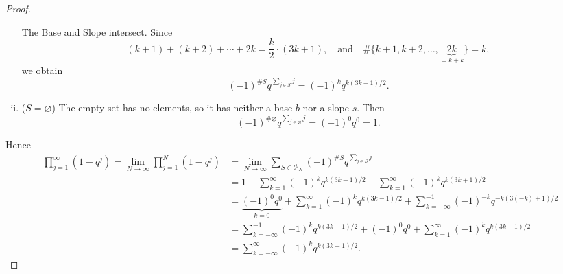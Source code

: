 \documentclass{article}
\theoremstyle{definition}
\newtheorem*{notation}{Notation}
\newcommand{\Z}{\mathbb{Z}}
\begin{document}
\begin{proof}
\begin{enumerate}[(i)]
\begin{center}
	\end{center}
	The Base and Slope intersect. Since \[
	(k+1)+(k+2)+\cdots+2k
	=
	\frac{k}{2}\cdot(3k+1),\quad\text{and}\quad
	\#\{k+1,k+2,\dots,\underbrace{2k}_{=k+k}\}=k,
	\] we obtain \[
	\boxed{(-1)^{\#S}q^{\sum_{j\in S}j}=(-1)^k q^{k(3k+1)/2}}.
	\]
	\item ($S=\varnothing$)\; The empty set has no elements, so it has neither a base $b$ nor a slope $s$. Then \[
	\boxed{(-1)^{\#\varnothing}q^{\sum_{j\in \varnothing}j}=(-1)^0q^0=1}.
	\]
\end{enumerate}
Hence
\begin{align*}
\prod_{j=1}^\infty(1-q^j)=\lim_{N\to\infty}\prod_{j=1}^N(1-q^j)
&=\lim_{N\to\infty}\sum_{S\in\mathcal P_N}(-1)^{\#S}q^{\sum_{j\in S}j}\\
	&=1+\sum_{k=1}^\infty (-1)^k q^{k(3k-1)/2}+\sum_{k=1}^\infty (-1)^k q^{k(3k+1)/2}\\
	&=\underbrace{(-1)^0q^0}_{k=0}+\sum_{k=1}^\infty (-1)^{k} q^{k(3k-1)/2}+
	\sum_{k=-\infty}^{-1} (-1)^{-k} q^{{-k}(3(-k)+1)/2}\\
	&=\sum_{k=-\infty}^{-1} (-1)^{k} q^{{k}(3k-1)/2}+
	{(-1)^0q^0}+\sum_{k=1}^\infty (-1)^{k} q^{k(3k-1)/2}\\
	&=\sum_{k=-\infty}^{\infty}(-1)^k q^{k(3k-1)/2}.
\end{align*}
\end{proof}

\end{document}
